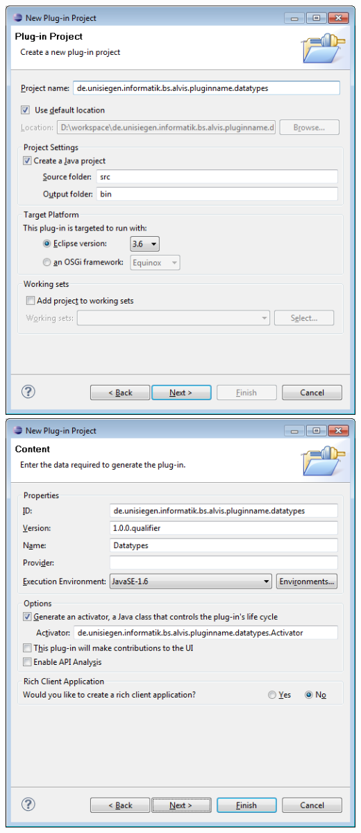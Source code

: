 \documentclass[10pt,a4paper]{article}
\begin{document}
\begin{center}
\includegraphics[scale=0.449]{images/new_plugin_datatypes_00}
\\
\includegraphics[scale=0.449]{images/new_plugin_datatypes_01}
\end{center}
\end{document}
